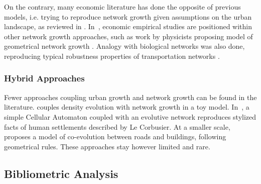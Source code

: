 On the contrary, many economic literature has done the opposite of previous models, i.e. trying to reproduce network growth given assumptions on the urban landscape, as reviewed in \cite{zhang2007economics}. In~\cite{xie2009modeling}, economic empirical studies are positioned within other network growth approaches, such as work by physicists proposing model of geometrical network growth \cite{barthelemy2008modeling}. Analogy with biological networks was also done, reproducing typical robustness properties of transportation networks \cite{tero2010rules}.

\subsubsection{Hybrid Approaches}

Fewer approaches coupling urban growth and network growth can be found in the literature. \cite{barthelemy2009co} couples density evolution with network growth in a toy model. In~\cite{raimbault2014hybrid}, a simple Cellular Automaton coupled with an evolutive network reproduces stylized facts of human settlements described by Le Corbusier. At a smaller scale, \cite{achibet2014model} proposes a model of co-evolution between roads and buildings, following geometrical rules. These approaches stay however limited and rare.


\subsection{Bibliometric Analysis}

